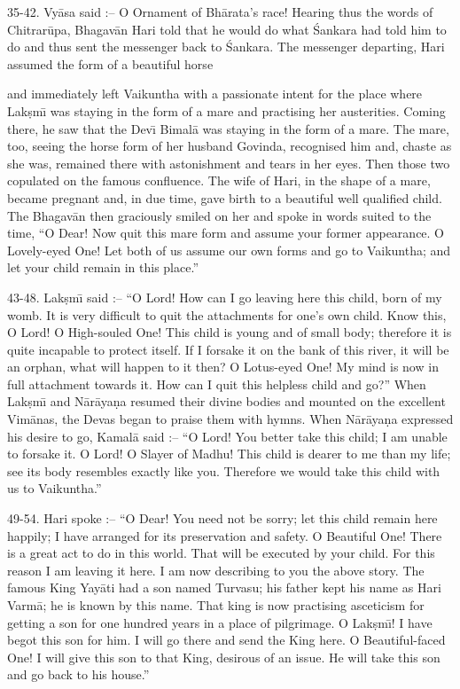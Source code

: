 35-42. Vy\=asa said :-- O Ornament of Bh\=arata's race! Hearing thus the words of Chitrar\=upa, Bhagav\=an Hari told that he would do what \'Sankara had told him to do and thus sent the messenger back to \'Sankara. The messenger departing, Hari assumed the form of a beautiful horse

and immediately left Vaikuntha with a passionate intent for the place where Lak\d{s}m\={\i} was staying in the form of a mare and practising her austerities. Coming there, he saw that the Dev\={\i} Bimal\=a was staying in the form of a mare. The mare, too, seeing the horse form of her husband Govinda, recognised him and, chaste as she was, remained there with astonishment and tears in her eyes. Then those two copulated on the famous confluence. The wife of Hari, in the shape of a mare, became pregnant and, in due time, gave birth to a beautiful well qualified child. The Bhagav\=an then graciously smiled on her and spoke in words suited to the time, ``O Dear! Now quit this mare form and assume your former appearance. O Lovely-eyed One! Let both of us assume our own forms and go to Vaikuntha; and let your child remain in this place.''

43-48. Lak\d{s}m\={\i} said :-- ``O Lord! How can I go leaving here this child, born of my womb. It is very difficult to quit the attachments for one's own child. Know this, O Lord! O High-souled One! This child is young and of small body; therefore it is quite incapable to protect itself. If I forsake it on the bank of this river, it will be an orphan, what will happen to it then? O Lotus-eyed One! My mind is now in full attachment towards it. How can I quit this helpless child and go?'' When Lak\d{s}m\={\i} and N\=ar\=aya\d{n}a resumed their divine bodies and mounted on the excellent Vim\=anas, the Devas began to praise them with hymns. When N\=ar\=aya\d{n}a expressed his desire to go, Kamal\=a said :-- ``O Lord! You better take this child; I am unable to forsake it. O Lord! O Slayer of Madhu! This child is dearer to me than my life; see its body resembles exactly like you. Therefore we would take this child with us to Vaikuntha.''

49-54. Hari spoke :-- ``O Dear! You need not be sorry; let this child remain here happily; I have arranged for its preservation and safety. O Beautiful One! There is a great act to do in this world. That will be executed by your child. For this reason I am leaving it here. I am now describing to you the above story. The famous King Yay\=ati had a son named Turvasu; his father kept his name as Hari Varm\=a; he is known by this name. That king is now practising asceticism for getting a son for one hundred years in a place of pilgrimage. O Lak\d{s}m\={\i}! I have begot this son for him. I will go there and send the King here. O Beautiful-faced One! I will give this son to that King, desirous of an issue. He will take this son and go back to his house.''

